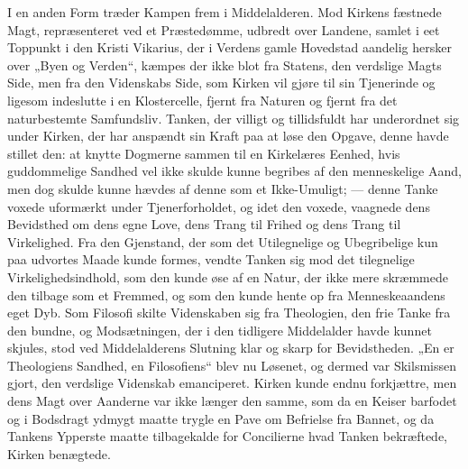 \documentclass[12pt,a4paper,openany]{book}
\newcommand{\opage}[1]{\marginnote{\footnotesize\textit{[#1]}}}
\begin{document}
I en anden Form træder Kampen frem i Middelalderen.
Mod Kirkens fæstnede Magt, repræsenteret ved et
Præstedømme, udbredt over Landene, samlet i eet Toppunkt
i den Kristi Vikarius, der i Verdens gamle Hovedstad aandelig
hersker over „Byen og Verden“, kæmpes der ikke blot
fra Statens, den verdslige Magts Side, men fra den
Videnskabs Side, som Kirken vil gjøre til sin Tjenerinde
og ligesom indeslutte i en Klostercelle, fjernt fra Naturen og
fjernt fra det naturbestemte Samfundsliv. Tanken, der villigt
og tillidsfuldt har underordnet sig under Kirken, der har
anspændt sin Kraft paa at løse den Opgave, denne havde
stillet den: at knytte Dogmerne sammen til en Kirkelæres
Eenhed, hvis guddommelige Sandhed vel ikke skulde kunne
begribes af den menneskelige Aand, men dog skulde kunne
hævdes af denne som et Ikke-Umuligt; --- denne Tanke
voxede uformærkt under Tjenerforholdet, og idet den voxede,
vaagnede dens Bevidsthed om dens egne Love, dens Trang
til Frihed og dens Trang til Virkelighed. Fra den Gjenstand,
der som det Utilegnelige og Ubegribelige kun paa udvortes
Maade kunde formes, vendte Tanken sig mod det
tilegnelige Virkelighedsindhold, som den kunde øse af en
Natur, der ikke mere skræmmede den tilbage som et Fremmed,
og som den kunde hente op fra Menneskeaandens eget
Dyb. Som Filosofi skilte Videnskaben sig fra Theologien,
den frie Tanke fra den bundne, og Modsætningen, der i den
\opage{292}tidligere Middelalder havde kunnet skjules, stod ved Middelalderens
Slutning klar og skarp for Bevidstheden. „En er
Theologiens Sandhed, en Filosofiens“ blev nu Løsenet, og
dermed var Skilsmissen gjort, den verdslige Videnskab
emanciperet. Kirken kunde endnu forkjættre, men dens
Magt over Aanderne var ikke længer den samme, som da
en Keiser barfodet og i Bodsdragt ydmygt maatte trygle en
Pave om Befrielse fra Bannet, og da Tankens Ypperste
maatte tilbagekalde for Concilierne hvad Tanken bekræftede,
Kirken benægtede.
\end{document}
